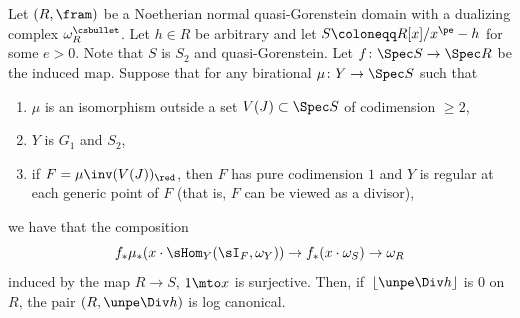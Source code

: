 \begin{lemma}\label{lemma lcness can be tested from S}
Let $(R,\fram)$ be a Noetherian normal quasi-Gorenstein domain with a dualizing complex $\omega_R^\csbullet$. Let $h\in R$ be arbitrary and let $S\coloneqq R[x]/x^\pe-h$ for some $e>0$. Note that $S$ is $S_2$ and quasi-Gorenstein.
Let $f\colon \Spec S\to \Spec R$ be the induced map. Suppose that for any birational $\mu\colon Y\to \Spec S$ such that
\begin{enumerate}
\item $\mu$ is an isomorphism outside a set $V(J)\subset \Spec S$ of codimension $\geq 2$,
\item $Y$ is $G_1$ and $S_2$,
\item if $F=\mu\inv(V(J))_{\red}$, then $F$ has pure codimension $1$ and $Y$ is regular at each generic point of $F$ (that is, $F$ can be viewed as a divisor),
\end{enumerate}
we have that the composition
\begin{equation}\label{map omegay(F) to omega(R) via x}
f_*\mu_*( x\cdot \sHom_Y(\sI_F,\omega_Y)) \to f_* (x\cdot \omega_S) \to \omega_R
\end{equation}
induced by the map $R\to S$, $1\mto x$ is surjective.
Then, if~$\lfloor \unpe\Div h \rfloor$ is $0$ on $R$, the pair $(R,\unpe \Div h)$ is log canonical.
\end{lemma}

